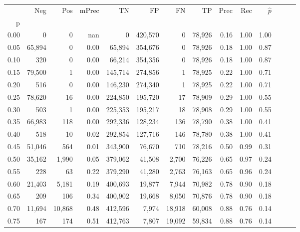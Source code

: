 \begin{tabular}{rrrrrrrrrrrrrr}
\toprule
{} &     Neg &     Pos & mPrec &       TN &       FP &      FN &      TP &  Prec &   Rec & $\hat{p}$ \\
p    &         &         &       &          &          &         &         &       &       &           \\
\midrule
0.00 &       0 &       0 &   nan &        0 &  420,570 &       0 &  78,926 &  0.16 &  1.00 &      1.00 \\
0.05 &  65,894 &       0 &  0.00 &   65,894 &  354,676 &       0 &  78,926 &  0.18 &  1.00 &      0.87 \\
0.10 &     320 &       0 &  0.00 &   66,214 &  354,356 &       0 &  78,926 &  0.18 &  1.00 &      0.87 \\
0.15 &  79,500 &       1 &  0.00 &  145,714 &  274,856 &       1 &  78,925 &  0.22 &  1.00 &      0.71 \\
0.20 &     516 &       0 &  0.00 &  146,230 &  274,340 &       1 &  78,925 &  0.22 &  1.00 &      0.71 \\
0.25 &  78,620 &      16 &  0.00 &  224,850 &  195,720 &      17 &  78,909 &  0.29 &  1.00 &      0.55 \\
0.30 &     503 &       1 &  0.00 &  225,353 &  195,217 &      18 &  78,908 &  0.29 &  1.00 &      0.55 \\
0.35 &  66,983 &     118 &  0.00 &  292,336 &  128,234 &     136 &  78,790 &  0.38 &  1.00 &      0.41 \\
0.40 &     518 &      10 &  0.02 &  292,854 &  127,716 &     146 &  78,780 &  0.38 &  1.00 &      0.41 \\
0.45 &  51,046 &     564 &  0.01 &  343,900 &   76,670 &     710 &  78,216 &  0.50 &  0.99 &      0.31 \\
0.50 &  35,162 &   1,990 &  0.05 &  379,062 &   41,508 &   2,700 &  76,226 &  0.65 &  0.97 &      0.24 \\
0.55 &     228 &      63 &  0.22 &  379,290 &   41,280 &   2,763 &  76,163 &  0.65 &  0.96 &      0.24 \\
0.60 &  21,403 &   5,181 &  0.19 &  400,693 &   19,877 &   7,944 &  70,982 &  0.78 &  0.90 &      0.18 \\
0.65 &     209 &     106 &  0.34 &  400,902 &   19,668 &   8,050 &  70,876 &  0.78 &  0.90 &      0.18 \\
0.70 &  11,694 &  10,868 &  0.48 &  412,596 &    7,974 &  18,918 &  60,008 &  0.88 &  0.76 &      0.14 \\
0.75 &     167 &     174 &  0.51 &  412,763 &    7,807 &  19,092 &  59,834 &  0.88 &  0.76 &      0.14 \\

\end{tabular}

